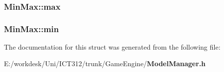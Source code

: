 \subsubsection[{max}]{ Min\+Max\+::max}\label{struct_min_max_a0d250a207e7f4a38d772f1f20e5d6424}
\subsubsection[{min}]{ Min\+Max\+::min}\label{struct_min_max_a9b99326fcf95386556926778b42ef126}


The documentation for this struct was generated from the following file\+:\begin{DoxyCompactItemize}
\item 
E\+:/workdesk/\+Uni/\+I\+C\+T312/trunk/\+Game\+Engine/{\bf Model\+Manager.\+h}\end{DoxyCompactItemize}
